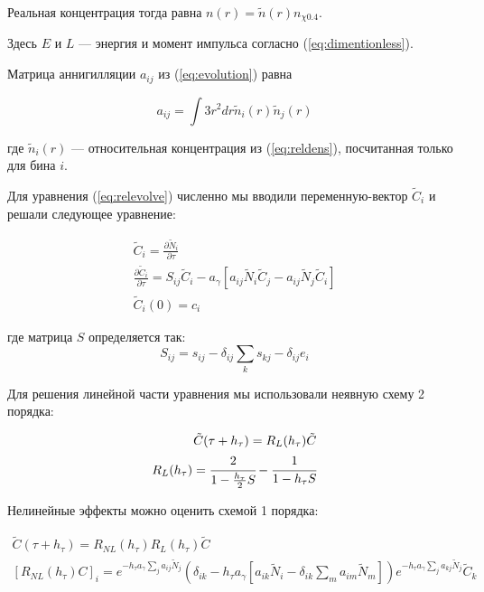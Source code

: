 \documentclass[a4paper, 14pt]{article}
\newcommand{\deriv}[2]{\frac{\partial #1}{\partial #2}}
\begin{document}
Реальная концентрация тогда равна $n(r) = \tilde{n}(r) n_{\chi 0.4}$. 

Здесь $E$ и $L$ --- энергия и момент импульса согласно (\ref{eq:dimentionless}). 

Матрица аннигилляции $a_{ij}$ из (\ref{eq:evolution}) равна

\begin{equation}
	a_{ij} = \int{3r^2dr \tilde{n}_i(r)\tilde{n}_j(r)}
\end{equation}

где $\tilde{n}_i(r)$ --- относительная концентрация из (\ref{eq:reldens}), посчитанная только для бина $i$.


Для уравнения (\ref{eq:relevolve}) численно мы вводили переменную-вектор $\tilde{C}_{i}$ и решали следующее уравнение:

\begin{equation}
\begin{split}
	\tilde{C}_i = \deriv{\tilde{N}_i}{\tau} \\
	\deriv{\tilde{C}_i}{\tau} = S_{ij} \tilde{C}_{i} - a_{\gamma} [a_{ij} \tilde{N}_i \tilde{C}_{j} - a_{ij} \tilde{N}_j \tilde{C}_{i}] \\
	\tilde{C}_i(0) = c_i
\end{split}
\end{equation}

где матрица $S$ определяется так:
\begin{equation}
	S_{ij} = s_{ij} - \delta_{ij} \sum_{k}{s_{kj}} - \delta_{ij} e_{i}
\end{equation}

Для решения линейной части уравнения мы использовали неявную схему 2 порядка:

\begin{equation}
\begin{split}
	\tilde{C}(\tau + h_{\tau}) = R_L(h_{\tau}) \tilde{C} \\
	R_L(h_{\tau}) = \cfrac{2}{1 - \frac{h_{\tau}}{2}S} - \cfrac{1}{1 - h_{\tau}S}
\end{split}
\end{equation}

Нелинейные эффекты можно оценить схемой 1 порядка:

\begin{equation}
	\begin{split}
		\tilde{C}(\tau + h_{\tau}) = R_{NL}(h_{\tau}) R_L(h_{\tau}) \tilde{C} \\
		[R_{NL}(h_{\tau}) C]_i = e^{-h_{\tau} a_{\gamma} \sum_j{a_{ij}\tilde{N}_j} } (\delta_{ik} - h_{\tau} a_{\gamma} [a_{ik}\tilde{N}_i - \delta_{ik}\sum_{m}{a_{im}\tilde{N}_m}])
		e^{-h_{\tau} a_{\gamma} \sum_j{a_{kj}\tilde{N}_j} } \tilde{C}_k
	\end{split}
\end{equation}
\end{document}
